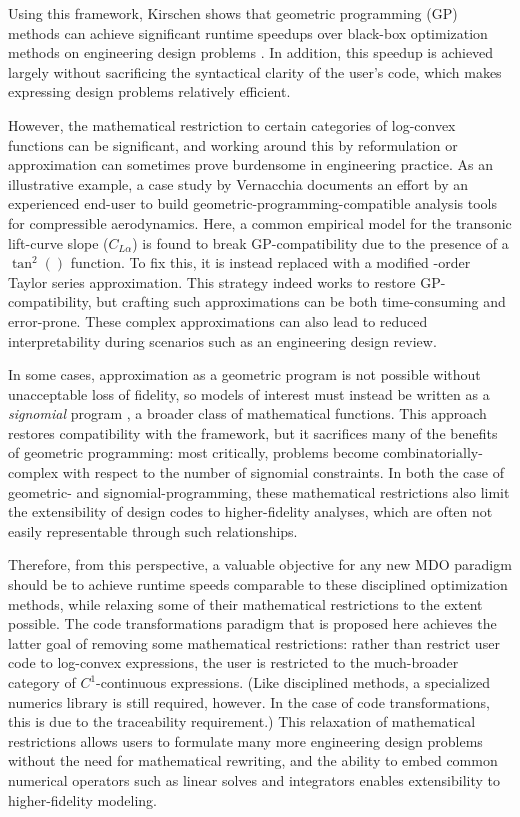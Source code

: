 Using this framework, Kirschen shows that geometric programming (GP) methods can achieve significant runtime speedups over black-box optimization methods on engineering design problems \cite{kirschen}. In addition, this speedup is achieved largely without sacrificing the syntactical clarity of the user's code, which makes expressing design problems relatively efficient.

However, the mathematical restriction to certain categories of log-convex functions can be significant, and working around this by reformulation or approximation can sometimes prove burdensome in engineering practice. As an illustrative example, a case study by Vernacchia \cite{vernacchia_gpkit} documents an effort by an experienced end-user to build geometric-programming-compatible analysis tools for compressible aerodynamics. Here, a common empirical model for the transonic lift-curve slope ($C_{L\alpha}$) is found to break GP-compatibility due to the presence of a $\tan^2()$ function. To fix this, it is instead replaced with a modified -order Taylor series approximation. This strategy indeed works to restore GP-compatibility, but crafting such approximations can be both time-consuming and error-prone. These complex approximations can also lead to reduced interpretability during scenarios such as an engineering design review.

In some cases, approximation as a geometric program is not possible without unacceptable loss of fidelity, so models of interest must instead be written as a \emph{signomial} program \cite{ozturk_optimal_2021, kirschen}, a broader class of mathematical functions. This approach restores compatibility with the framework, but it sacrifices many of the benefits of geometric programming: most critically, problems become combinatorially-complex with respect to the number of signomial constraints. In both the case of geometric- and signomial-programming, these mathematical restrictions also limit the extensibility of design codes to higher-fidelity analyses, which are often not easily representable through such relationships.

Therefore, from this perspective, a valuable objective for any new MDO paradigm should be to achieve runtime speeds comparable to these disciplined optimization methods, while relaxing some of their mathematical restrictions to the extent possible. The code transformations paradigm that is proposed here achieves the latter goal of removing some mathematical restrictions: rather than restrict user code to log-convex expressions, the user is restricted to the much-broader category of $C^1$-continuous expressions. (Like disciplined methods, a specialized numerics library is still required, however. In the case of code transformations, this is due to the traceability requirement.) This relaxation of mathematical restrictions allows users to formulate many more engineering design problems without the need for mathematical rewriting, and the ability to embed common numerical operators such as linear solves and integrators enables extensibility to higher-fidelity modeling.

